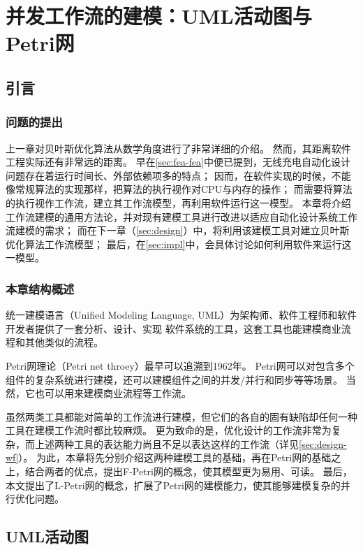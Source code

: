 \documentclass[index]{subfiles}
\begin{document}
\chapter{并发工作流的建模：UML活动图与Petri网}\label{sec:petri}
\section{引言}\label{sec:petri-intro}
\subsection{问题的提出}
上一章对贝叶斯优化算法从数学角度进行了非常详细的介绍。
然而，其距离软件工程实际还有非常远的距离。
早在\cref{sec:fea-fea}中便已提到，无线充电自动化设计问题存在着运行时间长、外部依赖项多的特点；
因而，在软件实现的时候，不能像常规算法的实现那样，把算法的执行视作对CPU与内存的操作；
而需要将算法的执行视作工作流，建立其工作流模型，再利用软件运行这一模型。
本章将介绍工作流建模的通用方法论，并对现有建模工具进行改进以适应自动化设计系统工作流建模的需求；
而在下一章（\cref{sec:design}）中，将利用该建模工具对建立贝叶斯优化算法工作流模型；
最后，在\cref{sec:impl}中，会具体讨论如何利用软件来运行这一模型。

\subsection{本章结构概述}
统一建模语言（Unified Modeling Language, UML）为架构师、软件工程师和软件开发者提供了一套分析、设计、实现
软件系统的工具，这套工具也能建模商业流程和其他类似的流程\cite{omg}。

Petri网理论（Petri net throey）最早可以追溯到1962年\cite{petri1962}。
Petri网可以对包含多个组件的复杂系统进行建模，还可以建模组件之间的并发/并行和同步等等场景\cite{peterson1981}。
当然，它也可以用来建模商业流程等工作流\cite{ellis1993}。

虽然两类工具都能对简单的工作流进行建模，但它们的各自的固有缺陷却任何一种工具在建模工作流时都比较麻烦。
更为致命的是，优化设计的工作流非常为复杂，而上述两种工具的表达能力尚且不足以表达这样的工作流（详见\cref{sec:design-wf}）。
为此，本章将先分别介绍这两种建模工具的基础，再在Petri网的基础之上，结合两者的优点，提出F-Petri网的概念，使其模型更为易用、可读。
最后，本文提出了L-Petri网的概念，扩展了Petri网的建模能力，使其能够建模复杂的并行优化问题。

\section{UML活动图}
\end{document}
